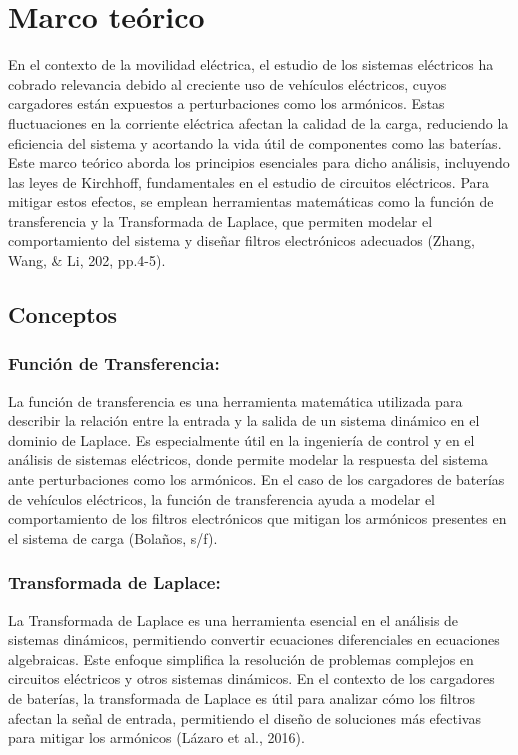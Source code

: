 \section{Marco teórico}
En el contexto de la movilidad eléctrica, el estudio de los sistemas eléctricos ha cobrado relevancia
debido al creciente uso de vehículos eléctricos, cuyos cargadores están expuestos a perturbaciones
como los armónicos. Estas fluctuaciones en la corriente eléctrica afectan la calidad de la carga,
reduciendo la eficiencia del sistema y acortando la vida útil de componentes como las baterías. Este
marco teórico aborda los principios esenciales para dicho análisis, incluyendo las leyes de Kirchhoff,
fundamentales en el estudio de circuitos eléctricos. Para mitigar estos efectos, se emplean
herramientas matemáticas como la función de transferencia y la Transformada de Laplace, que
permiten modelar el comportamiento del sistema y diseñar filtros electrónicos adecuados (Zhang,
Wang, \& Li, 202, pp.4-5).

\subsection{ Conceptos}

\subsubsection{ Función de Transferencia:}
La función de transferencia es una herramienta matemática utilizada para describir la
relación entre la entrada y la salida de un sistema dinámico en el dominio de Laplace. Es
especialmente útil en la ingeniería de control y en el análisis de sistemas eléctricos, donde
permite modelar la respuesta del sistema ante perturbaciones como los armónicos. En el caso
de los cargadores de baterías de vehículos eléctricos, la función de transferencia ayuda a
modelar el comportamiento de los filtros electrónicos que mitigan los armónicos presentes en
el sistema de carga (Bolaños, s/f).

\subsubsection{ Transformada de Laplace:}
La Transformada de Laplace es una herramienta esencial en el análisis de sistemas
dinámicos, permitiendo convertir ecuaciones diferenciales en ecuaciones algebraicas. Este
enfoque simplifica la resolución de problemas complejos en circuitos eléctricos y otros
sistemas dinámicos. En el contexto de los cargadores de baterías, la transformada de Laplace
es útil para analizar cómo los filtros afectan la señal de entrada, permitiendo el diseño de
soluciones más efectivas para mitigar los armónicos (Lázaro et al., 2016).

